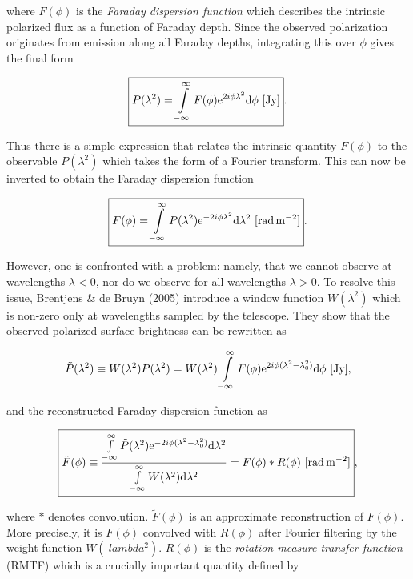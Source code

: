 \documentclass[a4paper,11pt]{article}
\begin{document}
{\noindent}where $F(\phi)$ is the \textit{Faraday dispersion function} which describes the intrinsic polarized flux as a function of Faraday depth. Since the observed polarization originates from emission along all Faraday depths, integrating this over $\phi$ gives the final form

\begin{align*}
    \boxed{P(\lambda^2) = \int\limits_{-\infty}^\infty F(\phi)\mathrm{e}^{2i\phi\lambda^2}\mathrm{d}\phi ~ [{\rm Jy}]}.
\end{align*}

{\noindent}Thus there is a simple expression that relates the intrinsic quantity $F(\phi)$ to the observable $P(\lambda^2)$ which takes the form of a Fourier transform. This can now be inverted to obtain the Faraday dispersion function

\begin{align*}
    \boxed{F(\phi) = \int\limits_{-\infty}^\infty P(\lambda^2)\mathrm{e}^{-2i\phi\lambda^2}\mathrm{d}\lambda^2 ~ [{\rm rad\,m^{-2}}]}.
\end{align*}

{\noindent}However, one is confronted with a problem: namely, that we cannot observe at wavelengths $\lambda<0$, nor do we observe for all wavelengths $\lambda>0$. To resolve this issue, Brentjens \& de Bruyn (2005) introduce a window function $W(\lambda^2)$ which is non-zero only at wavelengths sampled by the telescope. They show that the observed polarized surface brightness can be rewritten as 

\begin{align*}
    \tilde{P}(\lambda^2) \equiv W(\lambda^2)P(\lambda^2) = W(\lambda^2) \int\limits_{-\infty}^\infty F(\phi)\mathrm{e}^{2i\phi(\lambda^2-\lambda_0^2)}\mathrm{d}\phi ~ [{\rm Jy}],
\end{align*}

{\noindent}and the reconstructed Faraday dispersion function as

\begin{align*}
    \boxed{\tilde{F}(\phi) \equiv \dfrac{\int\limits_{-\infty}^\infty \tilde{P}(\lambda^2)\mathrm{e}^{-2i\phi(\lambda^2-\lambda_0^2)}\mathrm{d}\lambda^2}{\int\limits_{-\infty}^\infty W(\lambda^2)\mathrm{d}\lambda^2} = F(\phi) * R(\phi) ~ [{\rm rad\,m^{-2}}]},
\end{align*}

{\noindent}where $*$ denotes convolution. $\tilde{F}(\phi)$ is an approximate reconstruction of $F(\phi)$. More precisely, it is $F(\phi)$ convolved with $R(\phi)$ after Fourier filtering by the weight function $W(\
lambda^2)$. $R(\phi)$ is the \textit{rotation measure transfer function} (RMTF) which is a crucially important quantity defined by
\end{document}
